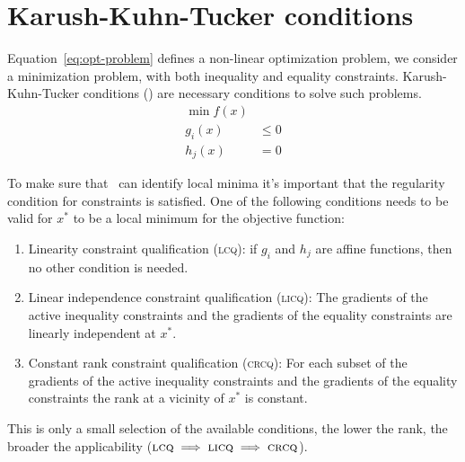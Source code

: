 \chapter{Karush-Kuhn-Tucker conditions}
\label{app:kkt}
Equation~\ref{eq:opt-problem} defines a non-linear optimization problem, we consider a minimization
problem, with both inequality and equality constraints. Karush-Kuhn-Tucker conditions (\kkt) are
necessary conditions to solve such problems.
\begin{equation}
	\label{eq:opt-problem}
	\begin{aligned}
		\min{f(x)} &        \\
		g_i(x)     & \leq 0 \\
		h_j(x)     & = 0
	\end{aligned}
\end{equation}

To make sure that \kkt\ can identify local minima it's important that the regularity condition for
constraints is satisfied. One of the following conditions needs to be valid for $x^*$ to be a local
minimum for the objective function:
\begin{enumerate}
	\item Linearity constraint qualification (\textsc{lcq}): if $g_i$ and $h_j$ are affine functions, then no
	      other condition is needed.
	\item Linear independence constraint qualification (\textsc{licq}): The gradients of the active inequality
	      constraints and the gradients of the equality constraints are linearly independent at $x^*$.
	\item Constant rank constraint qualification (\textsc{crcq}): For each subset of the gradients of the active
	      inequality constraints and the gradients of the equality constraints the rank at a vicinity
	      of $x^*$ is constant.
\end{enumerate}
This is only a small selection of the available conditions, the lower the rank, the broader the
applicability ($\textsc{lcq} \implies \textsc{licq} \implies \textsc{crcq}$).

